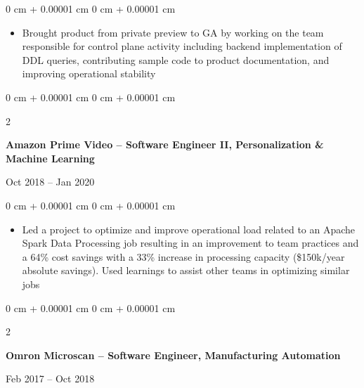 \documentclass[10pt, letterpaper]{article}
\newenvironment{highlights}{
    \begin{itemize}[
        topsep=0.10 cm,
        parsep=0.10 cm,
        partopsep=0pt,
        itemsep=0pt,
        leftmargin=0 cm + 10pt
    ]
}{
    \end{itemize}
} %
\newenvironment{onecolentry}{
    \begin{adjustwidth}{
        0 cm + 0.00001 cm
    }{
        0 cm + 0.00001 cm
    }
}{
    \end{adjustwidth}
} %
\newenvironment{twocolentry}[2][]{
    \onecolentry
    \def\secondColumn{#2}
    \setcolumnwidth{\fill, 4.5 cm}
    \begin{paracol}{2}
}{
    \switchcolumn \raggedleft \secondColumn
    \end{paracol}
    \endonecolentry
} %
\begin{document}
        \vspace{0.10 cm}
        \begin{onecolentry}
            \begin{highlights}
                \item Brought product from private preview to GA by working on the team responsible for control plane activity including backend implementation of DDL queries, contributing sample code to product documentation, and improving operational stability
            \end{highlights}
        \end{onecolentry}

        \vspace{0.2 cm}

        \begin{twocolentry}{
            Oct 2018 – Jan 2020
        }
            \textbf{Amazon Prime Video -- Software Engineer II, Personalization \& Machine Learning}
        \end{twocolentry}

        \vspace{0.10 cm}
        \begin{onecolentry}
            \begin{highlights}
                \item Led a project to optimize and improve operational load related to an Apache Spark Data Processing job resulting in an improvement to team practices and a 64\% cost savings with a 33\% increase in processing capacity (\$150k/year absolute savings). Used learnings to assist other teams in optimizing similar jobs
            \end{highlights}
        \end{onecolentry}

        \vspace{0.2 cm}

        \begin{twocolentry}{
            Feb 2017 – Oct 2018
        }
            \textbf{Omron Microscan – Software Engineer, Manufacturing Automation}
        \end{twocolentry}
\end{document}
